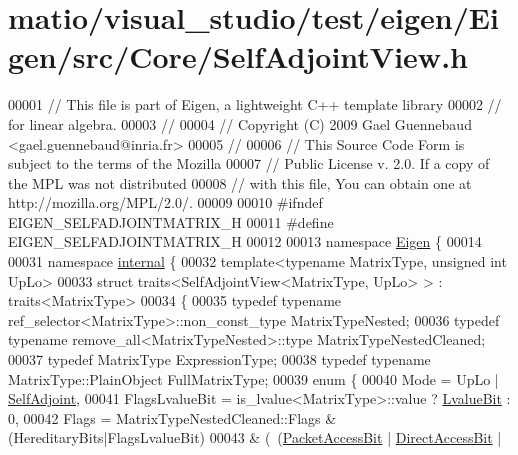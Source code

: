 \hypertarget{matio_2visual__studio_2test_2eigen_2_eigen_2src_2_core_2_self_adjoint_view_8h_source}{}\section{matio/visual\+\_\+studio/test/eigen/\+Eigen/src/\+Core/\+Self\+Adjoint\+View.h}
\label{matio_2visual__studio_2test_2eigen_2_eigen_2src_2_core_2_self_adjoint_view_8h_source}

\begin{DoxyCode}
00001 \textcolor{comment}{// This file is part of Eigen, a lightweight C++ template library}
00002 \textcolor{comment}{// for linear algebra.}
00003 \textcolor{comment}{//}
00004 \textcolor{comment}{// Copyright (C) 2009 Gael Guennebaud <gael.guennebaud@inria.fr>}
00005 \textcolor{comment}{//}
00006 \textcolor{comment}{// This Source Code Form is subject to the terms of the Mozilla}
00007 \textcolor{comment}{// Public License v. 2.0. If a copy of the MPL was not distributed}
00008 \textcolor{comment}{// with this file, You can obtain one at http://mozilla.org/MPL/2.0/.}
00009 
00010 \textcolor{preprocessor}{#ifndef EIGEN\_SELFADJOINTMATRIX\_H}
00011 \textcolor{preprocessor}{#define EIGEN\_SELFADJOINTMATRIX\_H}
00012 
00013 \textcolor{keyword}{namespace }\hyperlink{namespace_eigen}{Eigen} \{ 
00014 
00031 \textcolor{keyword}{namespace }\hyperlink{namespaceinternal}{internal} \{
00032 \textcolor{keyword}{template}<\textcolor{keyword}{typename} MatrixType, \textcolor{keywordtype}{unsigned} \textcolor{keywordtype}{int} UpLo>
00033 \textcolor{keyword}{struct }traits<SelfAdjointView<MatrixType, UpLo> > : traits<MatrixType>
00034 \{
00035   \textcolor{keyword}{typedef} \textcolor{keyword}{typename} ref\_selector<MatrixType>::non\_const\_type MatrixTypeNested;
00036   \textcolor{keyword}{typedef} \textcolor{keyword}{typename} remove\_all<MatrixTypeNested>::type MatrixTypeNestedCleaned;
00037   \textcolor{keyword}{typedef} MatrixType ExpressionType;
00038   \textcolor{keyword}{typedef} \textcolor{keyword}{typename} MatrixType::PlainObject FullMatrixType;
00039   \textcolor{keyword}{enum} \{
00040     Mode = UpLo | \hyperlink{group__enums_gga39e3366ff5554d731e7dc8bb642f83cda2491fc6765056421f504eb7e16083e8f}{SelfAdjoint},
00041     FlagsLvalueBit = is\_lvalue<MatrixType>::value ? \hyperlink{group__flags_gae2c323957f20dfdc6cb8f44428eaec1a}{LvalueBit} : 0,
00042     Flags =  MatrixTypeNestedCleaned::Flags & (HereditaryBits|FlagsLvalueBit)
00043            & (~(\hyperlink{group__flags_ga1a306a438e1ab074e8be59512e887b9f}{PacketAccessBit} | \hyperlink{group__flags_gabf1e9d0516a933445a4c307ad8f14915}{DirectAccessBit} | 

\end{DoxyCode}
